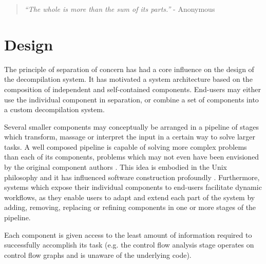 
%

\begin{quote}
	\textit{``The whole is more than the sum of its parts.''} - Anonymous
\end{quote}

\section{Design}
\label{sec:design}



The principle of separation of concern has had a core influence on the design of the decompilation system. It has motivated a system architecture based on the composition of independent and self-contained components. End-users may either use the individual component in separation, or combine a set of components into a custom decompilation system.

Several smaller components may conceptually be arranged in a pipeline of stages which transform, massage or interpret the input in a certain way to solve larger tasks. A well composed pipeline is capable of solving more complex problems than each of its components, problems which may not even have been envisioned by the original component authors \cite{simplicity_and_collaboration}. This idea is embodied in the Unix philosophy and it has influenced software construction profoundly \cite{art_of_unix}. Furthermore, systems which expose their individual components to end-users facilitate dynamic workflows, as they enable users to adapt and extend each part of the system by adding, removing, replacing or refining
components in one or more stages of the pipeline.

Each component is given access to the least amount of information required to successfully accomplish its task (e.g. the control flow analysis stage operates on control flow graphs and is unaware of the underlying code).








